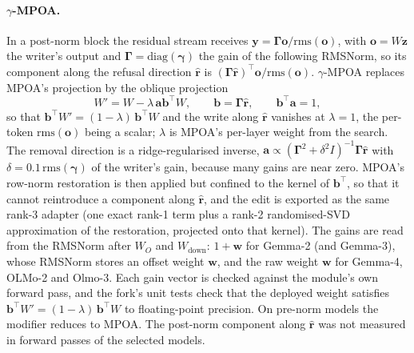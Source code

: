 \paragraph{$\gamma$-MPOA.} In a post-norm block the residual stream receives
$\mathbf{y}=\boldsymbol{\Gamma}\mathbf{o}/\mathrm{rms}(\mathbf{o})$, with
$\mathbf{o}=W\mathbf{z}$ the writer's output and
$\boldsymbol{\Gamma}=\mathrm{diag}(\boldsymbol{\gamma})$ the gain of the
following RMSNorm, so its component along the refusal direction
$\hat{\mathbf{r}}$ is $(\boldsymbol{\Gamma}\hat{\mathbf{r}})^{\top}\mathbf{o}/\mathrm{rms}(\mathbf{o})$.
$\gamma$-MPOA replaces MPOA's projection by the oblique projection
\[
W' = W - \lambda\,\mathbf{a}\mathbf{b}^{\top}W,\qquad
\mathbf{b}=\boldsymbol{\Gamma}\hat{\mathbf{r}},\qquad \mathbf{b}^{\top}\mathbf{a}=1,
\]
so that $\mathbf{b}^{\top}W'=(1-\lambda)\,\mathbf{b}^{\top}W$ and the write
along $\hat{\mathbf{r}}$ vanishes at $\lambda=1$, the per-token
$\mathrm{rms}(\mathbf{o})$ being a scalar; $\lambda$ is MPOA's per-layer
weight from the search. The removal direction is a ridge-regularised inverse,
$\mathbf{a}\propto(\boldsymbol{\Gamma}^2+\delta^2 I)^{-1}\boldsymbol{\Gamma}\hat{\mathbf{r}}$
with $\delta=0.1\,\mathrm{rms}(\boldsymbol{\gamma})$ of the writer's gain,
because many gains are near zero. MPOA's row-norm restoration is then applied
but confined to the kernel of $\mathbf{b}^{\top}$, so that it cannot
reintroduce a component along $\hat{\mathbf{r}}$, and the edit is exported as
the same rank-3 adapter (one exact rank-1 term plus a rank-2 randomised-SVD
approximation of the restoration, projected onto that kernel). The gains are
read from the RMSNorm after $W_O$ and $W_{\mathrm{down}}$: $1+\mathbf{w}$ for
Gemma-2 (and Gemma-3), whose RMSNorm stores an offset weight $\mathbf{w}$, and
the raw weight $\mathbf{w}$ for Gemma-4, OLMo-2 and Olmo-3. Each gain vector
is checked against the module's own forward pass, and the fork's unit tests
check that the deployed weight satisfies
$\mathbf{b}^{\top}W'=(1-\lambda)\,\mathbf{b}^{\top}W$ to floating-point
precision. On pre-norm models the modifier reduces to MPOA. The post-norm
component along $\hat{\mathbf{r}}$ was not measured in forward passes of the
selected models.

